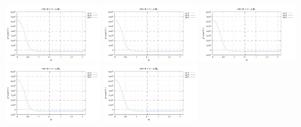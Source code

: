 \noindent
\includegraphics[width=3.5cm]{python_codes/fieldstone_152/RESULTS/exp3/qqq_32_m2}
\includegraphics[width=3.5cm]{python_codes/fieldstone_152/RESULTS/exp3/qqq_32_m3}
\includegraphics[width=3.5cm]{python_codes/fieldstone_152/RESULTS/exp3/qqq_32_m4}
\includegraphics[width=3.5cm]{python_codes/fieldstone_152/RESULTS/exp3/qqq_32_m5}
\includegraphics[width=3.5cm]{python_codes/fieldstone_152/RESULTS/exp3/qqq_32_m6}

